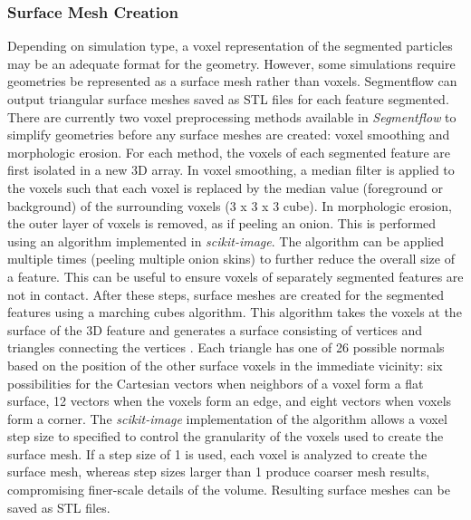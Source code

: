 \subsubsection{Surface Mesh Creation}
Depending on simulation type, a voxel representation of the segmented
particles may be an adequate format for the geometry. However,
some simulations require geometries be represented as a surface mesh
rather than voxels. Segmentflow can output triangular surface meshes saved
as STL files for each feature segmented.
There are currently two voxel preprocessing methods available in
\textit{Segmentflow} to
simplify geometries before any surface meshes are created: voxel smoothing
and morphologic erosion. For each method, the voxels of each segmented
feature are first isolated in a new 3D array. In voxel smoothing, a median
filter is applied to the voxels such that each voxel is replaced by the
median value (foreground or background) of the surrounding voxels (3 x 3 x 3
cube).
In morphologic erosion, the outer layer of voxels is removed, as if
peeling an onion. This is performed using an algorithm implemented in
\textit{scikit-image}. The algorithm can be applied multiple times
(peeling multiple onion skins) to further reduce the overall size of a
feature. This can be useful to ensure voxels of separately segmented
features are not in contact.
After these steps, surface meshes are created
for the segmented features using a marching cubes algorithm. This algorithm
takes the voxels at the surface of the 3D feature and generates
a surface consisting of vertices and triangles connecting the vertices
\cite{Lorensen1987, Lewiner2003}.
Each triangle has one of 26
possible normals based on the position of the other surface voxels in the
immediate vicinity: six possibilities for the Cartesian vectors when
neighbors of a voxel form a flat surface, 12 vectors when the voxels form
an edge, and eight vectors when voxels form a corner.
The \textit{scikit-image} implementation of the algorithm allows a voxel step
size to specified
to control the granularity of the voxels used to create the surface
mesh. If a step size of 1 is used, each voxel is analyzed to create the
surface mesh, whereas step sizes larger than 1 produce coarser mesh
results, compromising finer-scale details of the volume. Resulting surface
meshes can be saved as STL files.

